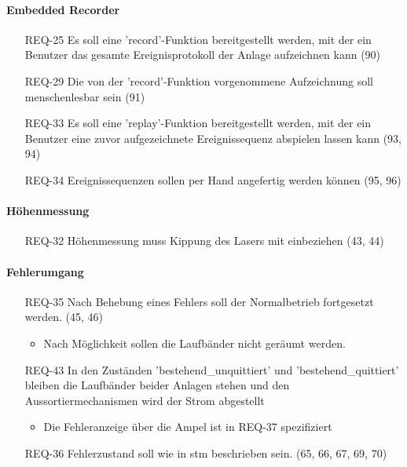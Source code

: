 \paragraph{Embedded Recorder}
\begin{itemize}
    \item[REQ-25] Es soll eine 'record'-Funktion bereitgestellt werden, mit der ein Benutzer das gesamte Ereignisprotokoll der Anlage aufzeichnen kann (90)
    \item[REQ-29] Die von der 'record'-Funktion vorgenommene Aufzeichnung soll menschenlesbar sein (91)
    \item[REQ-33] Es soll eine 'replay'-Funktion bereitgestellt werden, mit der ein Benutzer eine zuvor aufgezeichnete Ereignissequenz abspielen lassen kann (93, 94)
    \item[REQ-34] Ereignissequenzen sollen per Hand angefertig werden können (95, 96)
\end{itemize}

\paragraph{Höhenmessung}
\begin{itemize}
    \item[REQ-32] Höhenmessung muss Kippung des Lasers mit einbeziehen (43, 44)
\end{itemize}

\paragraph{Fehlerumgang}
\begin{itemize}
    \item[REQ-35] Nach Behebung eines Fehlers soll der Normalbetrieb fortgesetzt werden. (45, 46)
    \begin{itemize}
        \item Nach Möglichkeit sollen die Laufbänder nicht geräumt werden.
    \end{itemize}
    \item[REQ-43] In den Zuständen 'bestehend\_unquittiert' und 'bestehend\_quittiert' bleiben die Laufbänder beider Anlagen stehen und den Aussortiermechanismen wird der Strom abgestellt
    \begin{itemize}
        \item Die Fehleranzeige über die Ampel ist in REQ-37 spezifiziert
    \end{itemize}
    \item[REQ-36] Fehlerzustand soll wie in stm beschrieben sein. (65, 66, 67, 69, 70)
\end{itemize}